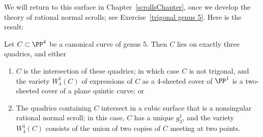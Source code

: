 We will return to this surface in Chapter~\ref{scrollsChapter}, once we develop the theory of rational normal scrolls; see Exercise~\ref{trigonal genus 5}.
Here is the result:

\begin{theorem}
Let $C \subset \PP^4$ be a canonical curve of genus 5. Then $C$ lies on exactly three quadrics, and either
\begin{enumerate}
\item $C$ is the intersection of these quadrics; in which case $C$ is not trigonal, and the variety $W^1_4(C)$ of expressions of $C$ as a 4-sheeted cover of $\PP^1$ is a two-sheeted cover of a plane quintic curve; or
\item The quadrics containing $C$ intersect in a cubic surface that is
a nonsingular rational normal scroll; in this case, $C$ has a unique $g^1_3$, and the variety $W^1_4(C)$ consists of the union of two copies of $C$ meeting at two points.
\end{enumerate}
\end{theorem}


